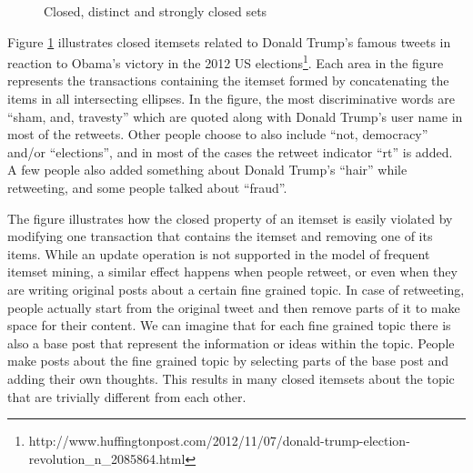 \documentclass[letterpaper,12pt,titlepage,oneside,final]{book}
\begin{document}
\begin{figure}
\centering
{}
\caption{Closed, distinct and strongly closed sets}
\label{fig:sham}
\end{figure}

Figure \ref{fig:sham} illustrates closed itemsets related to Donald
Trump's famous tweets in reaction to Obama's victory in the
2012 US elections\footnote{http://www.huffingtonpost.com/2012/11/07/donald-trump-election-revolution\_n\_2085864.html}.  
Each area in the figure represents the transactions containing the itemset
formed by concatenating the items in all intersecting ellipses.  
In the figure, the most discriminative words are ``sham, and, travesty''
which are quoted along with Donald Trump's user name in most of the retweets.
Other people choose to also include ``not, democracy'' and/or ``elections'',
and in most of the cases the retweet indicator ``rt'' is added. 
A few people also added something about Donald Trump's ``hair'' 
while retweeting, and some people talked about ``fraud''. 

The figure illustrates how
the closed property of an itemset is easily violated by modifying one
transaction that contains the itemset and removing one of its items.
While an update operation is not supported in the model of frequent itemset mining, 
a similar effect happens when people retweet, 
or even when they are writing original posts about 
a certain fine grained topic.
In case of retweeting, people actually start from the original tweet and 
then remove parts of it to make space for their content. 
We can imagine that for each fine grained topic there is also a base post
that represent the information or ideas within the topic. 
People make posts about the fine grained topic 
by selecting parts of the base post
and adding their own thoughts.
This results in many closed itemsets 
about the topic that
are trivially different from each other.
\end{document}
